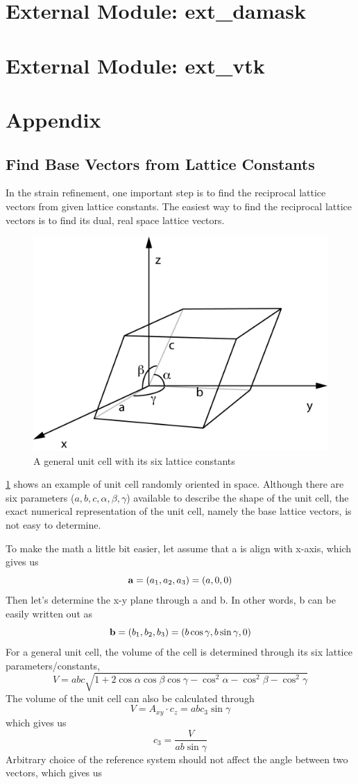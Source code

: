 \documentclass[12pt]{scrartcl}
\begin{document}
\section{External Module: ext\_damask}

\section{External Module: ext\_vtk}

\section{Appendix}
\subsection{Find Base Vectors from Lattice Constants}
\label{sec:lc2bv}
In the strain refinement, one important step is to find the reciprocal lattice vectors from given lattice constants. 
The easiest way to find the reciprocal lattice vectors is to find its dual, real space lattice vectors. 

\begin{figure}[htp]
\centering
\includegraphics[width=.7\linewidth]{UnitCell.png}
\caption{A general unit cell with its six lattice constants}
\label{fig:unitcell}
\end{figure}

\cref{fig:unitcell} shows an example of unit cell randomly oriented in space. 
Although there are six parameters ($a,b,c, \alpha, \beta, \gamma$) available to describe the shape of the unit cell, the exact numerical representation of the unit cell, namely the base lattice vectors, is not easy to determine. 

To make the math a little bit easier, let assume that \vctr a is align with x-axis, which gives us
\[
	\mathbf{a} = (a_1, a_2, a_3) = (a, 0, 0)
\]
Then let's determine the x-y plane through \vctr a and \vctr b.
In other words, \vctr b can be easily written out as
\[
	\mathbf{b} = (b_1, b_2, b_3) = (b\cos\gamma, b\sin\gamma, 0)
\]
For a general unit cell, the volume of the cell is determined through its six lattice parameters/constants, 
\[
	V = abc\sqrt{1 + 2\cos\alpha\cos\beta\cos\gamma - \cos^2\alpha-\cos^2\beta-\cos^2\gamma}
\]
The volume of the unit cell can also be calculated through 
\[
	V = A_{xy}\cdot c_z = abc_3\sin\gamma 
\]
which gives us 
\[
	c_3 = \dfrac{V}{ab\sin\gamma}
\]
Arbitrary choice of the reference system should not affect the angle between two vectors, which gives us 
\end{document}
